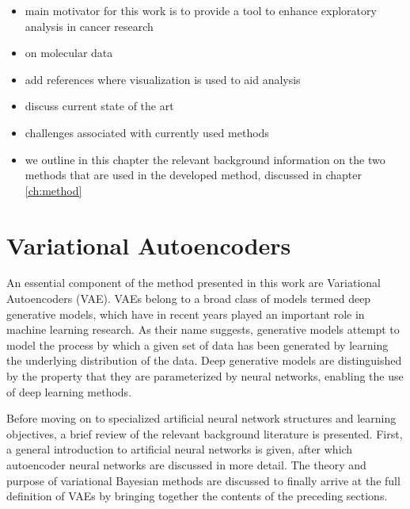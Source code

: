 
\begin{itemize}
\item main motivator for this work is to provide a tool to enhance exploratory analysis in cancer research
\item on molecular data
\item add references where visualization is used to aid analysis
\item discuss current state of the art
\item challenges associated with currently used methods
\item we outline in this chapter the relevant background information on the two methods that are used in the developed method, discussed in chapter \ref{ch:method}
\end{itemize}

\section{Variational Autoencoders}
\label{section:variational_autoencoders}

An essential component of the method presented in this work are Variational Autoencoders (VAE). VAEs belong to a broad class of models termed deep generative models, which have in recent years played an important role in machine learning research. As their name suggests, generative models attempt to model the process by which a given set of data has been generated by learning the underlying distribution of the data. Deep generative models are distinguished by the property that they are parameterized by neural networks, enabling the use of deep learning methods.



Before moving on to specialized artificial neural network structures and learning objectives, a brief review of the relevant background literature is presented. First, a general introduction to artificial neural networks is given, after which autoencoder neural networks are discussed in more detail. The theory and purpose of variational Bayesian methods are discussed to finally arrive at the full definition of VAEs by bringing together the contents of the preceding sections.

